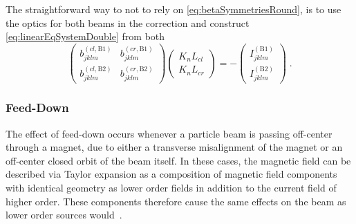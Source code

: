 The straightforward way to not to rely on \cref{eq:betaSymmetriesRound}, 
is to use the optics for both beams in the correction and construct \cref{eq:linearEqSystemDouble} from both
%
\begin{equation}    
    \label{eq:linearEqSystemDoubleOptics}
        \begin{pmatrix}
            b_{jklm}^{(cl, \text{B1})} & b_{jklm}^{(cr, \text{B1})} \\
            b_{jklm}^{(cl, \text{B2})} & b_{jklm}^{(cr, \text{B2})}
        \end{pmatrix}
        \begin{pmatrix}
            K_{n}L_{cl} \\ 
            K_{n}L_{cr}
        \end{pmatrix}
        = - 
        \begin{pmatrix}
            I^{(\text{B1})}_{jklm} \\ 
            I^{(\text{B2})}_{jklm} 
        \end{pmatrix} 
        \; .
\end{equation}

\subsubsection{Feed-Down} %

The effect of feed-down occurs whenever a particle beam is passing off-center through a magnet, 
due to either a transverse misalignment of the magnet or an off-center closed orbit of the beam itself.
In these cases, the magnetic field can be described via Taylor expansion as a composition of 
magnetic field components with identical geometry as lower order fields in addition to the current field of higher order. 
These components therefore cause the same effects on the beam 
as lower order sources would~\cite{WiedemannParticleAcceleratorPhysics2015}. 

